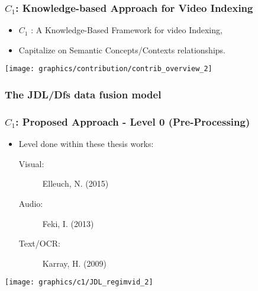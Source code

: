 \begin{frame}
	\frametitle{$C_{1}$: Knowledge-based Approach for Video Indexing}
	\begin{itemize}
	  \small
	  \item $C_{1}$ : A \alert{Knowledge-Based} Framework for video Indexing,
	  \item Capitalize on Semantic \alert{Concepts/Contexts relationships}.
	\end{itemize}
	\begin{center}\texttt{[image: graphics/contribution/contrib\_overview\_2]} \end{center}

\end{frame}

\begin{frame}
	\frametitle{The JDL/Dfs data fusion model \citep{Waltz1990}}
\end{frame}


\begin{frame}
	\frametitle{$C_{1}$: Proposed Approach - Level 0 (Pre-Processing)}
	\small
	\begin{block}{}
		\begin{itemize}
			\item Level done within these thesis works:
				\begin{description}
					\item[Visual:] Elleuch, N. (2015)
					\item[Audio:] Feki, I. (2013)
					\item[Text/OCR:] Karray, H. (2009)
				\end{description}
		\end{itemize}
	\end{block}
	{\centering\texttt{[image: graphics/c1/JDL\_regimvid\_2]}}
\end{frame}

